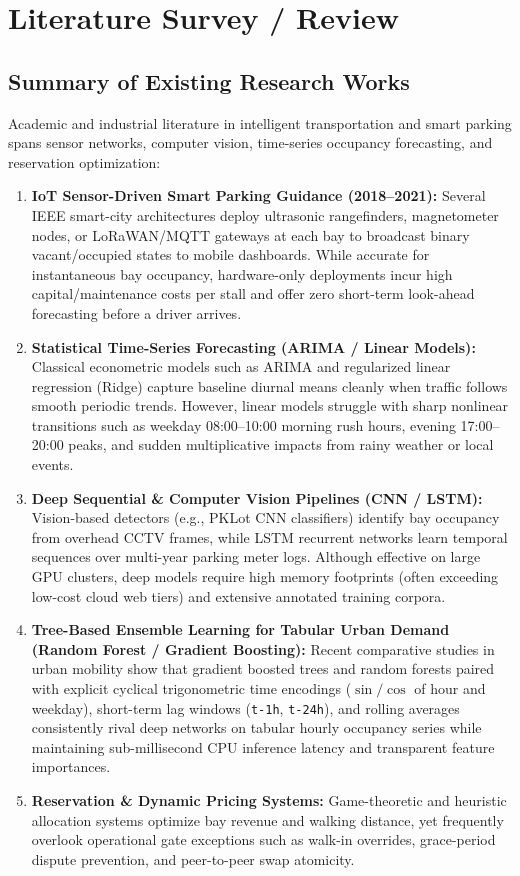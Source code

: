 \documentclass[12pt,a4paper,oneside]{report}
\begin{document}
\chapter{Literature Survey / Review}

\section{Summary of Existing Research Works}
Academic and industrial literature in intelligent transportation and smart parking spans sensor networks, computer vision, time-series occupancy forecasting, and reservation optimization:

\begin{enumerate}[leftmargin=*]
  \item \textbf{IoT Sensor-Driven Smart Parking Guidance (2018--2021):} Several IEEE smart-city architectures deploy ultrasonic rangefinders, magnetometer nodes, or LoRaWAN/MQTT gateways at each bay to broadcast binary vacant/occupied states to mobile dashboards. While accurate for instantaneous bay occupancy, hardware-only deployments incur high capital/maintenance costs per stall and offer zero short-term look-ahead forecasting before a driver arrives.
  \item \textbf{Statistical Time-Series Forecasting (ARIMA / Linear Models):} Classical econometric models such as ARIMA and regularized linear regression (Ridge) capture baseline diurnal means cleanly when traffic follows smooth periodic trends. However, linear models struggle with sharp nonlinear transitions such as weekday 08:00--10:00 morning rush hours, evening 17:00--20:00 peaks, and sudden multiplicative impacts from rainy weather or local events.
  \item \textbf{Deep Sequential \& Computer Vision Pipelines (CNN / LSTM):} Vision-based detectors (e.g., PKLot CNN classifiers) identify bay occupancy from overhead CCTV frames, while LSTM recurrent networks learn temporal sequences over multi-year parking meter logs. Although effective on large GPU clusters, deep models require high memory footprints (often exceeding low-cost cloud web tiers) and extensive annotated training corpora.
  \item \textbf{Tree-Based Ensemble Learning for Tabular Urban Demand (Random Forest / Gradient Boosting):} Recent comparative studies in urban mobility show that gradient boosted trees and random forests paired with explicit cyclical trigonometric time encodings ($\sin/\cos$ of hour and weekday), short-term lag windows (\texttt{t-1h}, \texttt{t-24h}), and rolling averages consistently rival deep networks on tabular hourly occupancy series while maintaining sub-millisecond CPU inference latency and transparent feature importances.
  \item \textbf{Reservation \& Dynamic Pricing Systems:} Game-theoretic and heuristic allocation systems optimize bay revenue and walking distance, yet frequently overlook operational gate exceptions such as walk-in overrides, grace-period dispute prevention, and peer-to-peer swap atomicity.
\end{enumerate}
\end{document}
